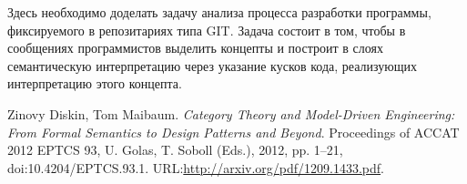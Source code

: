 \documentclass[12pt,a4paper]{extarticle}
\begin{document}
Здесь необходимо доделать задачу анализа процесса разработки программы,
фиксируемого в репозитариях типа GIT\@.  Задача состоит в том, чтобы в сообщениях
программистов выделить концепты и построит в слоях семантическую интерпретацию
через указание кусков кода, реализующих интерпретацию этого концепта.

\begin{thebibliography}{9}
 Zinovy Diskin, Tom Maibaum. \emph{Category Theory and
    Model-Driven Engineering: From Formal Semantics to Design Patterns and Beyond}. Proceedings of ACCAT 2012
EPTCS 93, U. Golas, T. Soboll (Eds.), 2012, pp. 1–21, doi:10.4204/EPTCS.93.1. URL:\url{http://arxiv.org/pdf/1209.1433.pdf}.
\end{thebibliography}
\end{document}
